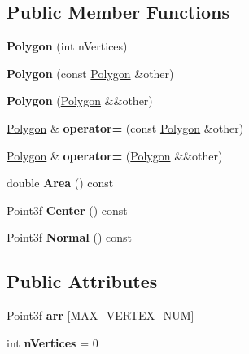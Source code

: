 \subsection*{Public Member Functions}
\begin{DoxyCompactItemize}
\item 
\mbox{\label{class_polygon_a30007de4ec1b150d50714a6bde4fb79d}} 
{\bfseries Polygon} (int n\+Vertices)
\item 
\mbox{\label{class_polygon_a117451a285cc0c9d443638cd449e032b}} 
{\bfseries Polygon} (const \mbox{\hyperlink{class_polygon}{Polygon}} \&other)
\item 
\mbox{\label{class_polygon_ad8fc5651b8c9161a8b47b49eff09fe9c}} 
{\bfseries Polygon} (\mbox{\hyperlink{class_polygon}{Polygon}} \&\&other)
\item 
\mbox{\label{class_polygon_a073ed9d24fca614f09b23b0ed6571e36}} 
\mbox{\hyperlink{class_polygon}{Polygon}} \& {\bfseries operator=} (const \mbox{\hyperlink{class_polygon}{Polygon}} \&other)
\item 
\mbox{\label{class_polygon_a90dd4293d3da213a7d313fd3f36b354b}} 
\mbox{\hyperlink{class_polygon}{Polygon}} \& {\bfseries operator=} (\mbox{\hyperlink{class_polygon}{Polygon}} \&\&other)
\item 
\mbox{\label{class_polygon_a93e54fdbdb5a7de543eccbed07e0f7c8}} 
double {\bfseries Area} () const
\item 
\mbox{\label{class_polygon_a8f283e92255018b9f8331e24aaf75c57}} 
\mbox{\hyperlink{struct_point3f}{Point3f}} {\bfseries Center} () const
\item 
\mbox{\label{class_polygon_a2b1fae8937c3b44cce5022d2eee61f31}} 
\mbox{\hyperlink{struct_point3f}{Point3f}} {\bfseries Normal} () const
\end{DoxyCompactItemize}
\subsection*{Public Attributes}
\begin{DoxyCompactItemize}
\item 
\mbox{\label{class_polygon_a5e9924cf3d12df34b38dc75707c05254}} 
\mbox{\hyperlink{struct_point3f}{Point3f}} {\bfseries arr} \mbox{[}M\+A\+X\+\_\+\+V\+E\+R\+T\+E\+X\+\_\+\+N\+UM\mbox{]}
\item 
\mbox{\label{class_polygon_acad554243e51c93bbb13371c576006ea}} 
int {\bfseries n\+Vertices} = 0
\end{DoxyCompactItemize}

